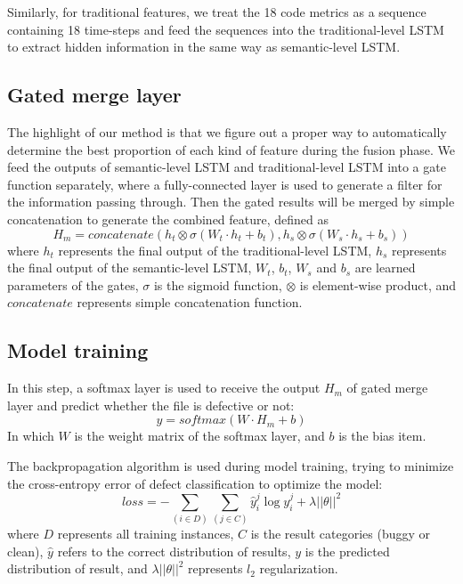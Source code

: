\documentclass[journal]{IEEEtran}
\begin{document}
Similarly, for traditional features, we treat the 18 code metrics as a sequence containing 18 time-steps and feed the sequences into the traditional-level LSTM to extract hidden information in the same way as semantic-level LSTM.

\subsection{Gated merge layer}
The highlight of our method is that we figure out a proper way to automatically determine the best proportion of each kind of feature during the fusion phase. We feed the outputs of semantic-level LSTM and traditional-level LSTM into a gate function separately, where a fully-connected layer is used to generate a filter for the information passing through. Then the gated results will be merged by simple concatenation to generate the combined feature, defined as
\begin{equation}
H_{m}=concatenate(h_{t} \otimes \sigma(W_{t} \cdot h_{t} + b_{t} ), h_{s} \otimes \sigma(W_{s} \cdot h_{s} + b_{s}))
\end{equation}
where $h_{t}$ represents the final output of the traditional-level LSTM, $h_{s}$ represents the final output of the semantic-level LSTM, $W_{t}$, $b_{t}$, $W_{s}$ and $b_{s}$ are learned parameters of the gates, $\sigma$ is the sigmoid function, $\otimes$ is element-wise product, and $concatenate$ represents simple concatenation function.

\subsection{Model training}
In this step, a softmax layer is used to receive the output $H_{m}$ of gated merge layer and predict whether the file is defective or not:
\begin{equation}
y=softmax(W \cdot H_{m} + b)
\end{equation}
In which $W$ is the weight matrix of the softmax layer, and $b$ is the bias item.


The backpropagation algorithm is used during model training, trying to minimize the cross-entropy error of defect classification to optimize the model:
\begin{equation}
loss=-\sum_{(i\in D)}\sum_{(j\in C)}\hat{y}_{i}^{j}\log y_{i}^{j}+\lambda||\theta||^{2}
\end{equation}
where $D$ represents all training instances, $C$ is the result categories (buggy or clean), $\hat{y}$ refers to the correct distribution of results, $y$ is the predicted distribution of result, and $\lambda||\theta||^{2}$ represents $l_2$ regularization.
\end{document}

